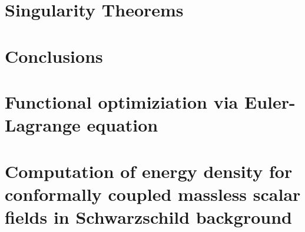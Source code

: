 \documentclass[12pt, a4paper]{book}
\begin{document}
\chapter{Singularity Theorems}
\label{ch:singularity-theorems} 


\chapter{Conclusions}


\appendix

\chapter[Euler-Lagrange optimization]{Functional optimiziation via Euler-Lagrange equation}
\label{app:V-E-L-optimization}


\chapter[Energy density in Schwarzschild background]{Computation of energy density for conformally coupled massless scalar fields in Schwarzschild background}
\label{app:visser}


\printbibliography[heading=bibintoc]
\end{document}
